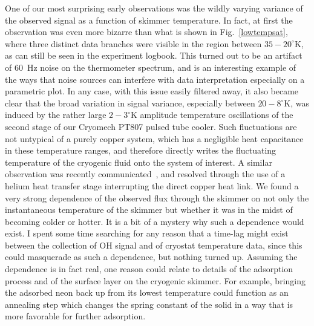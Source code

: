 One of our most surprising early observations was the wildly varying variance of the observed signal as a function of skimmer temperature. 
In fact, at first the observation was even more bizarre than what is shown in Fig.~\ref{lowtempsat}, where three distinct data branches were visible in the region between $35-20^\circ$K, as can still be seen in the experiment logbook.
This turned out to be an artifact of $60$~Hz noise on the thermometer spectrum, and is an interesting example of the ways that noise sources can interfere with data interpretation especially on a parametric plot.
In any case, with this issue easily filtered away, it also became clear that the broad variation in signal variance, especially between $20-8^\circ$K, was induced by the rather large $2-3^\circ$K amplitude temperature oscillations of the second stage of our Cryomech PT807 pulsed tube cooler.
Such fluctuations are not untypical of a purely copper system, which has a negligible heat capacitance in these temperature ranges, and therefore directly writes the fluctuating temperature of the cryogenic fluid onto the system of interest.
A similar observation was recently communicated~\cite{Lancaster2019}, and resolved through the use of a helium heat transfer stage interrupting the direct copper heat link.
We found a very strong dependence of the observed flux through the skimmer on not only the instantaneous temperature of the skimmer but whether it was in the midst of becoming colder or hotter.
It is a bit of a mystery why such a dependence would exist.
I spent some time searching for any reason that a time-lag might exist between the collection of OH signal and of cryostat temperature data, since this could masquerade as such a dependence, but nothing turned up.
Assuming the dependence is in fact real, one reason could relate to details of the adsorption process and of the surface layer on the cryogenic skimmer.
For example, bringing the adsorbed neon back up from its lowest temperature could function as an annealing step which changes the spring constant of the solid in a way that is more favorable for further adsorption.


